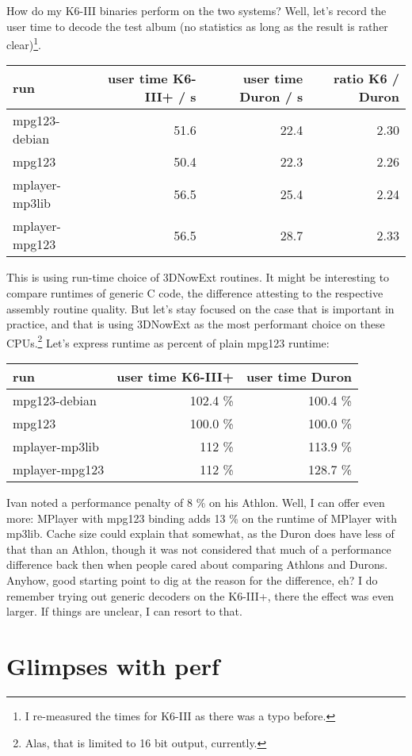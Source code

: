 \documentclass[a4paper,12pt]{scrartcl}
\begin{document}
How do my K6-III binaries perform on the two systems? Well, let's record the user time to decode the test album (no statistics as long as the result is rather clear)\footnote{I re-measured the times for K6-III as there was a typo before.}.
\begin{center}
\begin{tabular}{lrrr}
run & user time K6-III+ / s & user time Duron / s & ratio K6 / Duron \\
\hline
mpg123-debian & 51.6 & 22.4 & 2.30 \\
mpg123 & 50.4 & 22.3 & 2.26 \\
mplayer-mp3lib & 56.5 & 25.4 & 2.24 \\
mplayer-mpg123 & 56.5 & 28.7 & 2.33
\end{tabular}
\end{center}

This is using run-time choice of 3DNowExt routines. It might be interesting to compare runtimes of generic C code, the difference attesting to the respective assembly routine quality.
But let's stay focused on the case that is important in practice, and that is using 3DNowExt as the most performant choice on these CPUs.\footnote{Alas, that is limited to 16 bit output, currently.}
Let's express runtime as percent of plain mpg123 runtime:
\begin{center}
\begin{tabular}{lrr}
run & user time K6-III+ & user time Duron \\
\hline
mpg123-debian & 102.4 \% & 100.4 \% \\
mpg123 & 100.0 \% & 100.0 \% \\
mplayer-mp3lib & 112 \% & 113.9 \% \\
mplayer-mpg123 & 112 \% & 128.7 \%
\end{tabular}
\end{center}

Ivan noted a performance penalty of 8 \% on his Athlon. Well, I can offer even more: MPlayer with mpg123 binding adds 13 \% on the runtime of MPlayer with mp3lib. Cache size could explain that somewhat, as the Duron does have less of that than an Athlon, though it was not considered that much of a performance difference back then when people cared about comparing Athlons and Durons.
Anyhow, good starting point to dig at the reason for the difference, eh? I do remember trying out generic decoders on the K6-III+, there the effect was even larger. If things are unclear, I can resort to that.

\section{Glimpses with perf}
\end{document}
